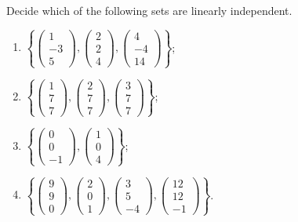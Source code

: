 \begin{exercise}{}{}
 Decide which of the following sets are linearly independent.
 \begin{enumerate}[label=(\alph*)]
  \item $\left\{ 
   \begin{pmatrix}
    1\\
    -3\\
    5
   \end{pmatrix},
   \begin{pmatrix}
    2\\
    2\\
    4
   \end{pmatrix},
   \begin{pmatrix}
    4\\
    -4\\
    14
   \end{pmatrix}
   \right\}$;
  \item $\left\{ 
   \begin{pmatrix}
    1\\
    7\\
    7
   \end{pmatrix},
   \begin{pmatrix}
    2\\
    7\\
    7
   \end{pmatrix},
   \begin{pmatrix}
    3\\
    7\\
    7
   \end{pmatrix}
   \right\}$;
  \item $\left\{ 
   \begin{pmatrix}
    0\\
    0\\
    -1
   \end{pmatrix},
   \begin{pmatrix}
    1\\
    0\\
    4
   \end{pmatrix}
   \right\}$;
  \item $\left\{ 
   \begin{pmatrix}
    9\\
    9\\
    0
   \end{pmatrix},
   \begin{pmatrix}
    2\\
    0\\
    1
   \end{pmatrix},
   \begin{pmatrix}
    3\\
    5\\
    -4
   \end{pmatrix},
   \begin{pmatrix}
    12\\
    12\\
    -1
   \end{pmatrix}
   \right\}$.
 \end{enumerate}
\end{exercise}
